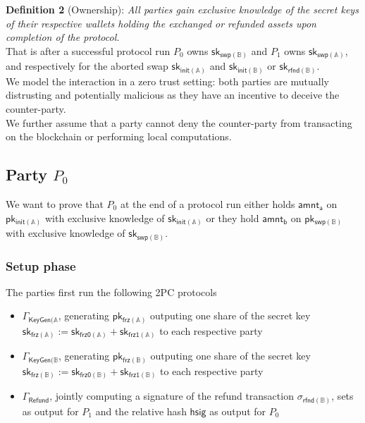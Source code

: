\documentclass{article}      	%
\begin{document}
\textbf{Definition 2} (Ownership): \textit{All parties gain exclusive knowledge of the secret keys of their respective wallets holding the exchanged or refunded assets upon completion of the protocol.} 
\vspace{0.5em}
\\
That is after a successful protocol run $P_0$ owns $\mathsf{sk_{swp(\mathbb{B})}}$ and $P_1$ owns $\mathsf{sk_{swp(\mathbb{A})}}$, and respectively for the aborted swap  $\mathsf{sk_{init(\mathbb{A})}}$ and $\mathsf{sk_{init(\mathbb{B})}}$ or $\mathsf{sk_{rfnd(\mathbb{B})}}$. \\


We model the interaction in a zero trust setting: both parties are mutually distrusting and potentially malicious as they have an incentive to deceive the counter-party. \\
We further assume that a party cannot deny the counter-party from transacting on the blockchain or performing local computations.


\subsection{Party $P_0$}
We want to prove that $P_0$ at the end of a protocol run either holds $\mathsf{amnt_a}$ on $\mathsf{pk_{init(\mathbb{A})}}$ with exclusive knowledge of $\mathsf{sk_{init(\mathbb{A})}}$ or they hold $\mathsf{amnt_b}$ on $\mathsf{pk_{swp(\mathbb{B})}}$ with exclusive knowledge of $\mathsf{sk_{swp(\mathbb{B})}}$. \\

\subsubsection*{Setup phase}
The parties first run the following 2PC protocols 
\begin{itemize}
    \item  $\Gamma_{\mathsf{KeyGen(\mathbb{A}}}$, generating $\mathsf{pk_{frz(\mathbb{A})}}$ outputing one share of the secret key $\mathsf{sk_{frz(\mathbb{A})}} := \mathsf{sk_{frz0(\mathbb{A})}} + \mathsf{sk_{frz1(\mathbb{A})}}$ to each respective party 
    \item  $\Gamma_{\mathsf{KeyGen(\mathbb{B}}}$, generating $\mathsf{pk_{frz(\mathbb{B})}}$ outputing one share of the secret key $\mathsf{sk_{frz(\mathbb{B})}} := \mathsf{sk_{frz0(\mathbb{B})}} + \mathsf{sk_{frz1(\mathbb{B})}}$ to each respective party
    \item  $\Gamma_{\mathsf{Refund}}$, jointly computing a signature of the refund transaction $\sigma_{\mathsf{rfnd(\mathbb{B})}}$, sets as output for $P_1$ and the relative hash $\mathsf{hsig}$ as output for $P_0$
\end{itemize}
\end{document}
